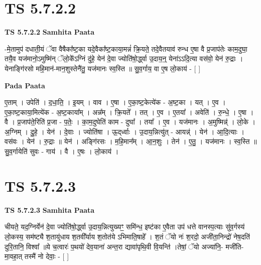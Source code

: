 \documentclass[17pt]{extarticle}
\begin{document}

\section{ TS 5.7.2.2 }

\textbf{TS 5.7.2.2 } \newline
\textbf{Samhita Paata} \newline

-मे॒तामुप॑ दधाती॒यं ॅवा वैषैका᳚ष्ट॒का यदे॒वैका᳚ष्ट॒काया॒मन्नं॑ क्रि॒यते॒ तदे॒वैतयाव॑ रुन्ध ए॒षा वै प्र॒जाप॑तेः काम॒दुघा॒ तयै॒व यज॑मानो॒ऽमुष्मि॑न् ॅलो॒के᳚ऽग्निं दु॑हे॒ येन॑ दे॒वा ज्योति॑षो॒र्द्ध्वा उ॒दाय॒न्॒ येना॑ऽऽदि॒त्या वस॑वो॒ येन॑ रु॒द्राः । येनाङ्गि॑रसो महि॒मान॑-मान॒शुस्तेनै॑तु॒ यज॑मानः स्व॒स्ति ॥ सु॒व॒र्गाय॒ वा ए॒ष लो॒काय॑ - [  ] \newline

\textbf{Pada Paata} \newline

ए॒ताम् । उपेति॑ । द॒धा॒ति॒ । इ॒यम् । वाव । ए॒षा । ए॒का॒ष्ट॒केत्ये॑क - अ॒ष्ट॒का । यत् । ए॒व । ए॒का॒ष्ट॒काया॒मित्ये॑क - अ॒ष्ट॒काया᳚म् । अन्न᳚म् । क्रि॒यते᳚ । तत् । ए॒व । ए॒तया᳚ । अवेति॑ । रु॒न्धे॒ । ए॒षा । वै । प्र॒जाप॑ते॒रिति॑ प्र॒जा - प॒तेः॒ । का॒म॒दुघेति॑ काम - दुघा᳚ । तया᳚ । ए॒व । यज॑मानः । अ॒मुष्मिन्न्॑ । लो॒के । अ॒ग्निम् । दु॒हे॒ । येन॑ । दे॒वाः । ज्योति॑षा । ऊ॒द्‌र्ध्वाः । उ॒दाय॒न्नित्यु॑त् - आयन्न्॑ । येन॑ । आ॒दि॒त्याः । वस॑वः । येन॑ । रु॒द्राः ॥ येन॑ । अङ्गि॑रसः । म॒हि॒मान᳚म् । आ॒न॒शुः । तेन॑ । ए॒तु॒ । यज॑मानः । स्व॒स्ति ॥ सु॒व॒र्गायेति॑ सुवः - गाय॑ । वै । ए॒षः । लो॒काय॑ ।  \newline





\section{ TS 5.7.2.3 }

\textbf{TS 5.7.2.3 } \newline
\textbf{Samhita Paata} \newline

चीयते॒ यद॒ग्निर्येन॑ दे॒वा ज्योति॑षो॒र्द्ध्वा उ॒दाय॒न्नित्युख्यꣳ॒॒ समि॑न्ध॒  इष्ट॑का ए॒वैता उप॑ धत्ते वानस्प॒त्याः सु॑व॒र्गस्य॑ लो॒कस्य॒ सम॑ष्ट्यै श॒तायु॑धाय श॒तवी᳚र्याय श॒तोत॑ये ऽभिमाति॒षाहे᳚ । श॒तं ॅयो नः॑ श॒रदो॒ अजी॑ता॒निन्द्रो॑ नेष॒दति॑ दुरि॒तानि॒ विश्वा᳚ ॥ये च॒त्वारः॑ प॒थयो॑ देव॒याना॑ अन्त॒रा द्यावा॑पृथि॒वी वि॒यन्ति॑ ।तेषां॒ ॅयो अज्या॑नि॒- मजी॑ति-मा॒वहा॒त् तस्मै॑ नो देवाः॒ - [  ] \newline
\end{document}
